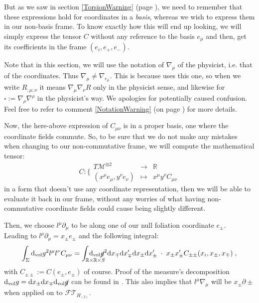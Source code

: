 \documentclass[a4paper,11pt]{article}
\numberwithin{equation}{section}
\theoremstyle{definition}
\renewcommand{\d}{{\mathrm{d}}}
\begin{document}
But as we saw in section \ref{TorsionWarning} (page \pageref{TorsionWarning}), we need to remember that these expressions hold for coordinates in a \emph{basis}, whereas we wish to express them in our non-basis frame. To know exactly how this will end up looking, we will simply express the tensor $C$ without any reference to the basis $e_\mu$ and then, get its coefficients in the frame $(e_i,e_+,e_-)$.

Note that in this section, we will use the notation of $\nabla_\mu$ of the physicist, i.e. that of the coordinates. Thus $\nabla_\mu \ne \nabla_{e_\mu}$. This is because \cite{QFTCurv} uses this one, so when we write $R_{;\mu;\nu}$ it means $\nabla_\mu \nabla_\nu R$ only in the physicist sense, and likewise for $\square:=\nabla_\rho \nabla^\rho$ in the physicist's way. We apologies for potentially caused confusion. Feel free to refer to comment \ref{NotationWarning} (on page \pageref{NotationWarning}) for more details.

Now, the here-above expression of $C_{\mu\nu}$ is in a proper basis, one where the coordinate fields commute. So, to be sure that we do not make any mistakes when changing to our non-commutative frame, we will compute the mathematical tensor:
\begin{equation}
C : \Bigg\{\begin{matrix}
    T\mathcal{M}^{\otimes2} & \to & \mathbb{R}\\
    (x^\mu e_\mu, y^\nu e_\nu) & \mapsto & x^\mu y^\nu C_{\mu\nu}
\end{matrix}
\end{equation}
in a form that doesn't use any coordinate representation, then we will be able to evaluate it back in our frame, without any worries of what having non-commutative coordinate fields could cause being slightly different.

Then, we choose $l^\mu \partial_\mu$ to be along one of our null foliation coordinate $e_\pm$. \\
Leading to $l^\mu \partial_\mu = x_\pm e_\pm$ and the following integral:
\begin{equation}
    \int_\Sigma \d_\mathrm{vol}g^2 l^\mu l^\nu C_{\mu\nu} = \int_{\mathbb{R}\times \mathbb{R}\times S} \!\!\!\!\!\!\!\!\!\!\!\!\!\!\! \d_\mathrm{vol} \cancel{g}^2 \d x_\mp \d x_\mp' \d x_\pm \d x_\pm ' \;\cdot \; x_\pm x_\pm ' C_{\pm\pm}(x_i,x_\pm, x_\mp)\; ,
\end{equation}
with $C_{\pm\pm}:= C(e_\pm,e_\pm)$ of course. Proof of the measure's decomposition $\d_\mathrm{vol}g = \d x_\pm \d x_\mp \d_\mathrm{vol} \cancel{g}$ can be found in \cite{Art}. This also implies that $l^\mu \nabla_\mu$ will be $x_\pm \partial\pm$ when applied on to $\mathcal{FT}_{H_{(2)}}$.
\end{document}
